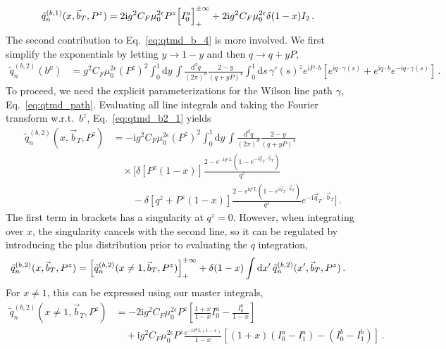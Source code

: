 \documentclass[11pt,a4paper]{article}
\DeclareRobustCommand{\eq}[1]{Eq.~\eqref{eq:#1}}
\newcommand{\df}{\mathrm{d}}
\newcommand{\img}{\mathrm{i}}
\newcommand{\eps}{\epsilon}
\newcommand{\nn}{\nonumber}
\newcommand{\bt}{\vec b_T}
\newcommand{\qt}{\vec q_T}
\newcommand{\plusinf}{_+^{\pm\infty}}
\begin{document}
\begin{align} \label{eq:qtmd_b1}
 \tilde q^{(b,1)}_n(x, \bt, P^z) &
 = 2 \img g^2 C_F \mu_0^{2\eps} P^z \Bigl[I_0^a\Bigr]\plusinf
 + 2 \img g^2 C_F \mu_0^{2\eps} \delta(1-x) I_2
\,.\end{align}
%
The second contribution to \eq{qtmd_b_4} is more involved.
We first simplify the exponentials by letting $y \to 1-y$ and then $q \to q + y P$,
\begin{align} \label{eq:qtmd_b2_1}
 \tilde q^{(b,2)}_n (b^\mu) &
 = g^2 C_F \mu_0^{2\eps} (P^z)^2
  \int_0^1 \df y \, \int\frac{\df^d q}{(2\pi)^d}
  \frac{2-y}{(q + y P)^4}
  \int_0^1 \df s \, \gamma'(s)^z
  e^{\img P \cdot b} \left[  e^{\img q \cdot \gamma(s)}
   + e^{\img q \cdot b} e^{-\img q \cdot\gamma(s)}\right]
\,.\end{align}
To proceed, we need the explicit parameterizations for the Wilson line path $\gamma$,
\eq{qtmd_path}.
Evaluating all line integrals and taking the Fourier transform w.r.t.\ $b^z$,
\eq{qtmd_b2_1} yields
\begin{align} \label{eq:qtmd_b2_2}
 \tilde q^{(b,2)}_n(x, \bt, P^z) &
 = -\img g^2 C_F \mu_0^{2\eps} (P^z)^2
  \int_0^1 \df y \, \int\frac{\df^d q}{(2\pi)^d} \frac{2-y}{(q + y P)^4}
  \nn\\&\quad\times
  \biggl[ \delta[P^z (1-x)] \frac{2 - e^{-\img q^z L}(1 - e^{-\img \qt \cdot \bt})}{q^z}
  \nn\\&\qquad
  - \delta[q^z + P^z (1-x)] \frac{2 - e^{\img q^z L}(1 - e^{\img \qt \cdot \bt})}{q^z} e^{-\img \qt \cdot \bt} \biggr]
\,.\end{align}
The first term in brackets has a singularity at $q^z = 0$.
However, when integrating over $x$, the singularity cancels with the second line,
so it can be regulated by introducing the plus distribution prior to evaluating the $q$ integration,
\begin{align} \label{eq:qtmd_b2_2.5}
 \tilde q^{(b,2)}_n(x, \bt, P^z)
 & = \Bigl[ \tilde q^{(b,2)}_n(x \ne 1, \bt, P^z) \Bigr]\plusinf
  + \delta(1-x) \int \df x' \, \tilde q^{(b,2)}_n(x', \bt, P^z)
\,.\end{align}
For $x \ne 1$, this can be expressed using our master integrals,
\begin{align} \label{eq:qtmd_b2_3}
 \tilde q^{(b,2)}_n(x \ne 1, \bt, P^z) &
 = -2 \img g^2 C_F \mu_0^{2\eps} P^z
  \left[ \frac{1+x}{1-x} I_0^a - \frac{I_0^b}{1-x} \right]
  \nn\\&\quad
  +\img g^2 C_F \mu_0^{2\eps} P^z \frac{e^{-\img P^zL (1-x) }}{1-x}
  \left[ (1+x) (I_0^a - I_1^a) - (I_0^b - I_1^b) \right]
\,.\end{align}
\end{document}

